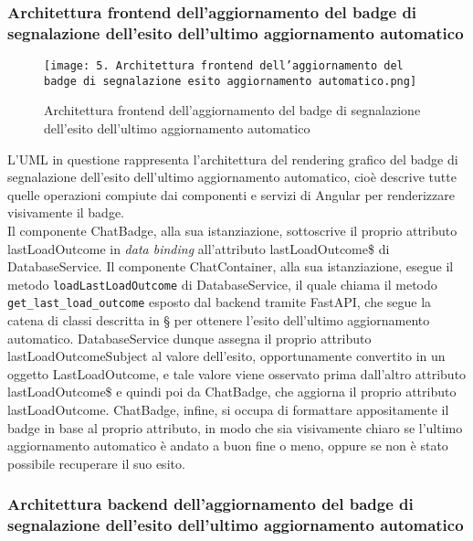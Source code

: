 \newpage


\subsubsection{Architettura frontend dell’aggiornamento del badge di segnalazione dell’esito dell’ultimo aggiornamento automatico}
\label{sec:architettura_frontend_badge_aggiornamento}

\begin{figure}[h]
    \centering
    \texttt{[image: 5. Architettura frontend dell'aggiornamento del badge di segnalazione esito aggiornamento automatico.png]}
    \caption{Architettura frontend dell’aggiornamento del badge di segnalazione dell’esito dell’ultimo aggiornamento automatico}
\end{figure}

L'UML in questione rappresenta l'architettura del rendering grafico del badge di segnalazione dell'esito dell'ultimo aggiornamento automatico, cioè descrive tutte quelle operazioni compiute dai componenti e servizi di Angular per renderizzare visivamente il badge.\\
Il componente ChatBadge, alla sua istanziazione, sottoscrive il proprio attributo lastLoadOutcome in \emph{data binding} all'attributo lastLoadOutcome\$ di DatabaseService. Il componente ChatContainer, alla sua istanziazione, esegue il metodo \texttt{loadLastLoadOutcome} di DatabaseService, il quale chiama il metodo \texttt{get\_last\_load\_outcome} esposto dal backend tramite FastAPI, che segue la catena di classi descritta in \S{} per ottenere l'esito dell'ultimo aggiornamento automatico. DatabaseService dunque assegna il proprio attributo lastLoadOutcomeSubject al valore dell'esito, opportunamente convertito in un oggetto LastLoadOutcome, e tale valore viene osservato prima dall'altro attributo lastLoadOutcome\$ e quindi poi da ChatBadge, che aggiorna il proprio attributo lastLoadOutcome. ChatBadge, infine, si occupa di formattare appositamente il badge in base al proprio attributo, in modo che sia visivamente chiaro se l'ultimo aggiornamento automatico è andato a buon fine o meno, oppure se non è stato possibile recuperare il suo esito.

\newpage


\subsubsection{Architettura backend dell’aggiornamento del badge di segnalazione dell’esito dell’ultimo aggiornamento automatico}
\label{sec:architettura_backend_badge_aggiornamento}

